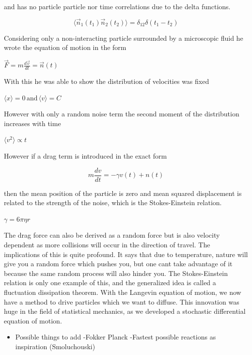 \documentclass[a4paper,11pt,oneside]{book}
\begin{document}
and has no particle particle nor time correlations due to the delta functions.

\begin{equation}
\langle \vec{n}_1(t_1) \vec{n}_2(t_2) \rangle = \delta_{12} \delta(t_1 - t_2)
\end{equation}

Considering only a non-interacting particle surrounded by a microscopic fluid he wrote the equation of motion in the form

$\vec{F} = m \frac{d\vec{v}}{dt} = \vec{n}(t)$

With this he was able to show the distribution of velocities was fixed

$\langle x \rangle = 0 \, \text{and} \, \langle v \rangle = C$

However with only a random noise term the second moment of the distribution increases with time

$\langle v^2 \rangle \propto t$

However if a drag term is introduced in the exact form

\begin{equation}
m\frac{dv}{dt} = -\gamma v(t) + n(t)
\end{equation}

then the mean position of the particle is zero and mean squared displacement is related to the strength of the noise, which is the Stokes-Einstein relation.

$\gamma = 6\pi\eta r$

The drag force can also be derived as a random force but is also velocity dependent as more collisions will occur in the direction of travel. The implications of this is quite profound. It says that due to temperature, nature will give you a random force which pushes you, but one cant take advantage of it because the same random process will also hinder you. The Stokes-Einstein relation is only one example of this, and the generalized idea is called a fluctuation dissipation theorem. With the Langevin equation of motion, we now have a method to drive particles which we want to diffuse. This innovation was huge in the field of statistical mechanics, as we developed a stochastic differential equation of motion.

\begin{itemize}
\item Possible things to add \newline
-Fokker Planck \newline
-Fastest possible reactions as inspiration (Smoluchouski)
\end{itemize}
\end{document}
